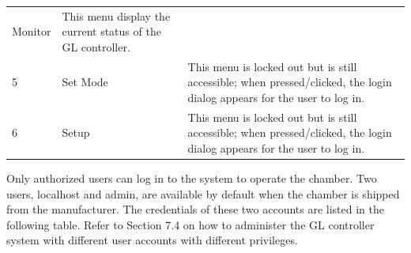 \begin{longtable}[]{@{}lll@{}}
\begin{minipage}[t]{0.14\columnwidth}
Monitor\strut
\end{minipage} & \begin{minipage}[t]{0.67\columnwidth}\raggedright
This menu display the current status of the GL controller.\strut
\end{minipage}\tabularnewline
\begin{minipage}[t]{0.10\columnwidth}\raggedright
5\strut
\end{minipage} & \begin{minipage}[t]{0.14\columnwidth}\raggedright
Set Mode\strut
\end{minipage} & \begin{minipage}[t]{0.67\columnwidth}\raggedright
This menu is locked out but is still accessible; when pressed/clicked,
the login dialog appears for the user to log in.\strut
\end{minipage}\tabularnewline
\begin{minipage}[t]{0.10\columnwidth}\raggedright
6\strut
\end{minipage} & \begin{minipage}[t]{0.14\columnwidth}\raggedright
Setup\strut
\end{minipage} & \begin{minipage}[t]{0.67\columnwidth}\raggedright
This menu is locked out but is still accessible; when pressed/clicked,
the login dialog appears for the user to log in.\strut
\end{minipage}\tabularnewline
\bottomrule
\end{longtable}

Only authorized users can log in to the system to operate the chamber.
Two users, localhost and admin, are available by default when the
chamber is shipped from the manufacturer. The credentials of these two
accounts are listed in the following table. Refer to Section 7.4 on how
to administer the GL controller system with different user accounts with
different privileges.

\pagebreak 

